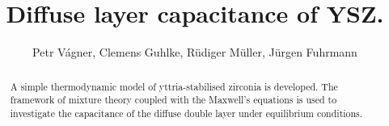 \documentclass{article}
\numberwithin{equation}{section}
\begin{document}
\author{Petr Vágner, Clemens Guhlke, Rüdiger Müller, Jürgen Fuhrmann}
\title{Diffuse layer capacitance of YSZ.}
\maketitle
\begin{abstract}
A simple thermodynamic model of yttria-stabilised zirconia is developed. 
The framework of mixture theory coupled with the Maxwell's equations
is used to investigate the capacitance of the diffuse double layer under equilibrium conditions.
\end{abstract}
\end{document}
